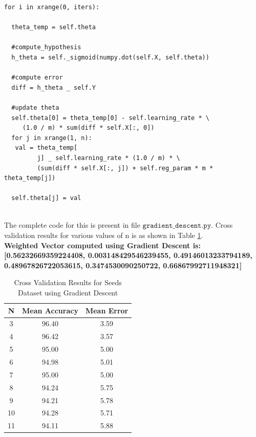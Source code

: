\documentclass[11pt, pdftex]{article}
\begin{document}
\begin{lstlisting}
for i in xrange(0, iters):

  theta_temp = self.theta
  
  #compute_hypothesis
  h_theta = self._sigmoid(numpy.dot(self.X, self.theta))
  
  #compute error
  diff = h_theta _ self.Y
  
  #update theta
  self.theta[0] = theta_temp[0] - self.learning_rate * \
     (1.0 / m) * sum(diff * self.X[:, 0])
  for j in xrange(1, n):
   val = theta_temp[
         j] _ self.learning_rate * (1.0 / m) * \
         (sum(diff * self.X[:, j]) + self.reg_param * m * theta_temp[j])
         
  self.theta[j] = val
\end{lstlisting}
\\
The complete code for this is present in file $\texttt{gradient\_descent.py}$. Cross validation results for various values of n is as shown in Table \ref{tab:gradcv}.\\
{\bf Weighted Vector computed using Gradient Descent is: [0.56232669359224408, 0.003148429546239455, 0.49146013233794189, 0.48967826722053615, 0.3474530090250722, 0.66867992711948321]}
\begin{table}
\centering
\begin{tabular}{ | c | c | c |}
    \hline
    {\bf N} & {\bf Mean Accuracy} & {\bf Mean Error}\\ 
    \hline
    3 & 96.40 & 3.59\\
	\hline
	4 & 96.42 & 3.57\\
	\hline
	5 & 95.00 & 5.00\\
	\hline
	6 & 94.98 & 5.01\\
	\hline
	7 & 95.00 & 5.00\\
	\hline
	8 & 94.24 & 5.75\\
	\hline
	9 & 94.21 & 5.78\\
	\hline
	10 & 94.28 & 5.71\\
	\hline
	11 & 94.11 & 5.88\\
	\hline
	\end{tabular}
	\caption{Cross Validation Results for Seeds Dataset using Gradient Descent}
    \label{tab:gradcv}
\end{table}
\end{document}
